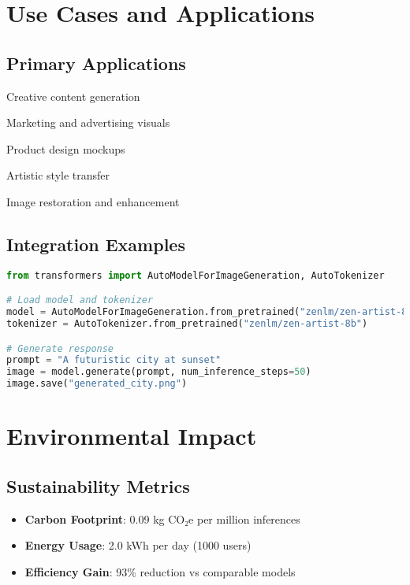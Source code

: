 \documentclass[11pt,a4paper]{article}
\begin{document}
\section{Use Cases and Applications}

\subsection{Primary Applications}
\item Creative content generation
\item Marketing and advertising visuals
\item Product design mockups
\item Artistic style transfer
\item Image restoration and enhancement

\subsection{Integration Examples}

\begin{lstlisting}[language=Python, caption=Basic Usage Example]
from transformers import AutoModelForImageGeneration, AutoTokenizer

# Load model and tokenizer
model = AutoModelForImageGeneration.from_pretrained("zenlm/zen-artist-8b")
tokenizer = AutoTokenizer.from_pretrained("zenlm/zen-artist-8b")

# Generate response
prompt = "A futuristic city at sunset"
image = model.generate(prompt, num_inference_steps=50)
image.save("generated_city.png")
\end{lstlisting}

\section{Environmental Impact}

\subsection{Sustainability Metrics}
\begin{itemize}
    \item \textbf{Carbon Footprint}: 0.09 kg CO₂e per million inferences
    \item \textbf{Energy Usage}: 2.0 kWh per day (1000 users)
    \item \textbf{Efficiency Gain}: 93\% reduction vs comparable models
\end{itemize}
\end{document}
